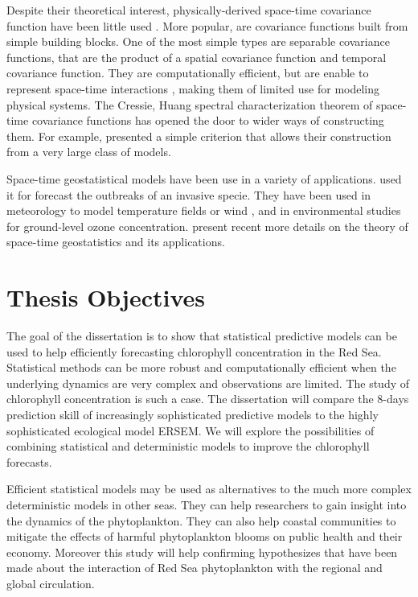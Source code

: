 Despite their theoretical interest, physically-derived space-time covariance function have been little used \cite{Gneiting2010}. More popular, are covariance functions built from simple building blocks. One of the most simple types are separable covariance functions, that are the product of a spatial covariance function and temporal covariance function. They are computationally efficient, but are enable to represent space-time interactions \cite{Cressie1999, Stein2005}, making them of limited use for modeling physical systems. The Cressie, Huang spectral characterization theorem of space-time covariance functions has opened the door to wider ways of constructing them. For example, \cite{Gneiting2002} presented a simple criterion that allows their construction from a very large class of models. 

Space-time geostatistical models have been use in a variety of applications. \cite{Hohn1993} used it for forecast the outbreaks of an invasive specie. They have been used in meteorology to model temperature fields \cite{Handcock1994, North2011} or wind \cite{Cressie1999, Gneiting2002}, and in environmental studies for ground-level ozone concentration. \cite{Gneiting2007, Gneiting2010} present recent more details on the theory of space-time geostatistics and its applications.  

\section{Thesis Objectives}

The goal of the dissertation is to show that statistical predictive models can be used to help efficiently forecasting chlorophyll concentration in the Red Sea. Statistical methods can be more robust and computationally efficient when the underlying dynamics are very complex and observations are limited. The study of chlorophyll concentration is such a case. The dissertation will compare the 8-days prediction skill of increasingly sophisticated predictive models to the highly sophisticated ecological model ERSEM. We will explore the possibilities of combining statistical and deterministic models to improve the chlorophyll forecasts.

Efficient statistical models may be used as alternatives to the much more complex deterministic models in other seas. They can help researchers to gain insight into the dynamics of the phytoplankton. They can also help coastal communities to mitigate the effects of harmful phytoplankton blooms on public health and their economy. Moreover this study will help confirming hypothesizes that have been made about the interaction of Red Sea phytoplankton with the regional and global circulation. 

